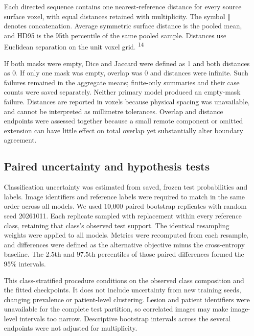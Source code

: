 \documentclass[11pt,a4paper]{article}
\begin{document}
Each directed sequence contains one nearest-reference distance for every source surface voxel, with equal distances retained with multiplicity. The symbol $\Vert$ denotes concatenation. Average symmetric surface distance is the pooled mean, and HD95 is the 95th percentile of the same pooled sample. Distances use Euclidean separation on the unit voxel grid. \textsuperscript{14}



If both masks were empty, Dice and Jaccard were defined as 1 and both distances as 0. If only one mask was empty, overlap was 0 and distances were infinite. Such failures remained in the aggregate means; finite-only summaries and their case counts were saved separately. Neither primary model produced an empty-mask failure. Distances are reported in voxels because physical spacing was unavailable, and cannot be interpreted as millimetre tolerances. Overlap and distance endpoints were assessed together because a small remote component or omitted extension can have little effect on total overlap yet substantially alter boundary agreement.



\subsection*{Paired uncertainty and hypothesis tests}

Classification uncertainty was estimated from saved, frozen test probabilities and labels. Image identifiers and reference labels were required to match in the same order across all models. We used 10,000 paired bootstrap replicates with random seed 20261011. Each replicate sampled with replacement within every reference class, retaining that class's observed test support. The identical resampling weights were applied to all models. Metrics were recomputed from each resample, and differences were defined as the alternative objective minus the cross-entropy baseline. The 2.5th and 97.5th percentiles of those paired differences formed the 95\% intervals.



This class-stratified procedure conditions on the observed class composition and the fitted checkpoints. It does not include uncertainty from new training seeds, changing prevalence or patient-level clustering. Lesion and patient identifiers were unavailable for the complete test partition, so correlated images may make image-level intervals too narrow. Descriptive bootstrap intervals across the several endpoints were not adjusted for multiplicity.
\end{document}
